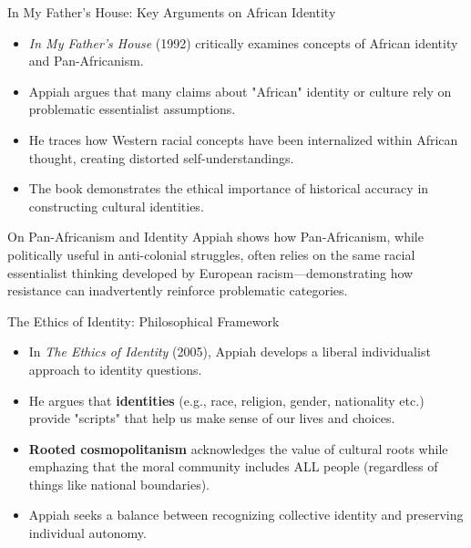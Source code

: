 \documentclass{beamer}
\begin{document}
	\begin{frame}{In My Father's House: Key Arguments on African Identity}
		\begin{itemize}
			\item \textit{In My Father's House} (1992) critically examines concepts of African identity and Pan-Africanism.
			\item Appiah argues that many claims about "African" identity or culture rely on problematic essentialist assumptions.
			\item He traces how Western racial concepts have been internalized within African thought, creating distorted self-understandings.
			\item The book demonstrates the ethical importance of historical accuracy in constructing cultural identities.
		\end{itemize}
		
		\begin{block}{On Pan-Africanism and Identity}
			Appiah shows how Pan-Africanism, while politically useful in anti-colonial struggles, often relies on the same racial essentialist thinking developed by European racism—demonstrating how resistance can inadvertently reinforce problematic categories.
		\end{block}
	\end{frame}
	
	\begin{frame}{The Ethics of Identity: Philosophical Framework}
		\begin{itemize}
			\item In \textit{The Ethics of Identity} (2005), Appiah develops a liberal individualist approach to identity questions.
			\item He argues that \textbf{identities} (e.g., race, religion, gender, nationality etc.) provide "scripts" that help us make sense of our lives and choices.
			\item \textbf{Rooted cosmopolitanism} acknowledges the value of cultural roots while emphazing that the moral community includes ALL people (regardless of things like national boundaries).
			\item Appiah seeks a balance between recognizing collective identity and preserving individual autonomy.
		\end{itemize}
		\end{frame}
	
\end{document}
